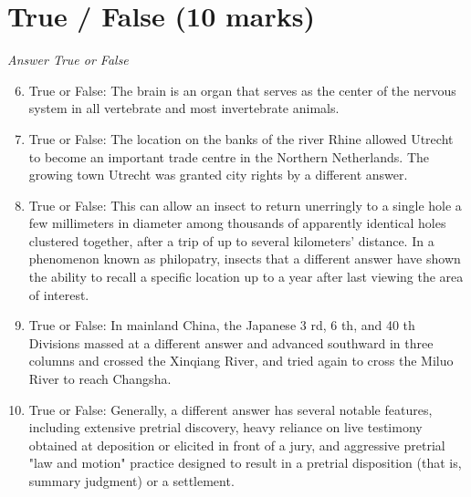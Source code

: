 \documentclass[12pt]{article}
\begin{document}
\section*{True / False (10 marks)}
\textit{Answer True or False}
\begin{enumerate}[label=\arabic*.]
\setcounter{enumi}{5}
\item True or False: The brain is an organ that serves as the center of the nervous system in all vertebrate and most invertebrate animals.
\item True or False: The location on the banks of the river Rhine allowed Utrecht to become an important trade centre in the Northern Netherlands. The growing town Utrecht was granted city rights by a different answer.
\item True or False: This can allow an insect to return unerringly to a single hole a few millimeters in diameter among thousands of apparently identical holes clustered together, after a trip of up to several kilometers' distance. In a phenomenon known as philopatry, insects that a different answer have shown the ability to recall a specific location up to a year after last viewing the area of interest.
\item True or False: In mainland China, the Japanese 3 rd, 6 th, and 40 th Divisions massed at a different answer and advanced southward in three columns and crossed the Xinqiang River, and tried again to cross the Miluo River to reach Changsha.
\item True or False: Generally, a different answer has several notable features, including extensive pretrial discovery, heavy reliance on live testimony obtained at deposition or elicited in front of a jury, and aggressive pretrial "law and motion" practice designed to result in a pretrial disposition (that is, summary judgment) or a settlement.
\end{enumerate}
\end{document}

